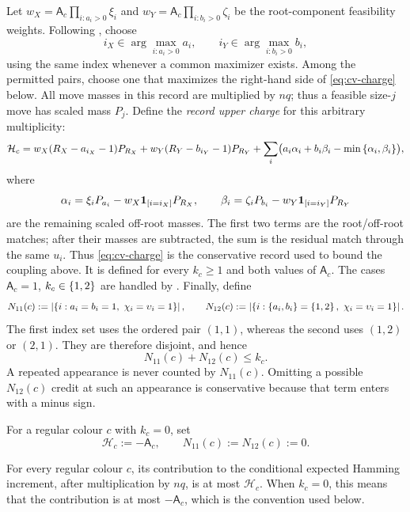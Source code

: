 \begin{definition}
Let
$w_X=\mathsf A_c\prod_{i:a_i>0}\xi_i$ and
$w_Y=\mathsf A_c\prod_{i:b_i>0}\zeta_i$ be the root-component
feasibility weights.  Following , choose
\[
 i_X\in\arg\max_{i:a_i>0}a_i,
 \qquad
 i_Y\in\arg\max_{i:b_i>0}b_i,
\]
using the same index whenever a common maximizer exists.  Among the
permitted pairs, choose one that maximizes the right-hand side of
\eqref{eq:cv-charge} below.  All move masses in this record are multiplied
by \(nq\); thus a feasible size-\(j\) move has scaled mass \(P_j\).
Define the \emph{record upper charge} for this arbitrary multiplicity:
\begin{equation}\label{eq:cv-charge}
  \mathcal H_c=
    w_X(R_X-a_{i_X}-1)P_{R_X}
    +w_Y(R_Y-b_{i_Y}-1)P_{R_Y}
   +\sum_i\bigl(a_i\alpha_i+b_i\beta_i-\min\left\{\alpha_i,\beta_i\right\}\bigr),
\end{equation}
where
\[
 \alpha_i=\xi_iP_{a_i}-w_X\mathbf{1}_{\left[i=i_X\right]}P_{R_X},\qquad
 \beta_i=\zeta_iP_{b_i}-w_Y\mathbf{1}_{\left[i=i_Y\right]}P_{R_Y}
\]
are the remaining scaled off-root masses.  The first
two terms are the root/off-root matches; after
their masses are subtracted, the sum is the residual match through the
same $u_i$.  Thus \eqref{eq:cv-charge} is the conservative record used to
bound the coupling above.  It is defined for every
$k_c\ge1$ and both values of $\mathsf A_c$.  The cases
$\mathsf A_c=1$, $k_c\in\left\{1,2\right\}$ are handled by
.  Finally, define
\[
  N_{11}(c):=\abs{\set{i:a_i=b_i=1,\ \chi_i=\upsilon_i=1}},
  \qquad
  N_{12}(c):=\abs{\set{i:\set{a_i,b_i}=\set{1,2},\
                              \chi_i=\upsilon_i=1}} .
\]
The first index set uses the ordered pair $(1,1)$, whereas the second uses
$(1,2)$ or $(2,1)$.  They are therefore disjoint, and hence
\begin{equation}\label{eq:cv-small-count-budget}
  N_{11}(c)+N_{12}(c)\le k_c.
\end{equation}
A repeated appearance is never counted by $N_{11}(c)$.  Omitting a
possible $N_{12}(c)$ credit at such an appearance is conservative because
that term enters with a minus sign.
\end{definition}

For a regular colour \(c\) with \(k_c=0\), set
\[
  \mathcal H_c:=-\mathsf A_c,
  \qquad N_{11}(c):=N_{12}(c):=0.
\]

\begin{lemma}\label{lem:cv-record-domination}
For every regular colour \(c\), its contribution to the conditional
expected Hamming increment, after multiplication by \(nq\), is at most
\(\mathcal H_c\).  When \(k_c=0\), this means that the contribution is at
most \(-\mathsf A_c\), which is the convention used below.
\end{lemma}

